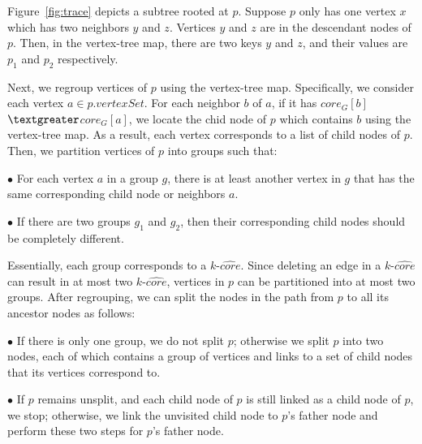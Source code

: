 \begin{example}
\label{em:reorganize}
Figure~\ref{fig:trace} depicts a subtree rooted at $p$.
Suppose $p$ only has one vertex $x$ which has two neighbors $y$ and $z$.
Vertices $y$ and $z$ are in the descendant nodes of $p$.
Then, in the vertex-tree map, there are two keys $y$ and $z$,
and their values are $p_1$ and $p_2$ respectively.
\end{example}

Next, we regroup vertices of $p$ using the vertex-tree map.
Specifically, we consider each vertex $a$$\in p.vertexSet$.
For each neighbor $b$ of $a$, if it has $core_G[b]$$\textgreater$$core_G[a]$,
we locate the chid node of $p$ which contains $b$ using the vertex-tree map.
As a result, each vertex corresponds to a list of child nodes of $p$.
Then, we partition vertices of $p$ into groups such that:

\noindent $\bullet$ For each vertex $a$ in a group $g$,
there is at least another vertex in $g$ that has the same corresponding child node or neighbors $a$.

\noindent $\bullet$ If there are two groups $g_1$ and $g_2$, then their corresponding
child nodes should be completely different.


Essentially, each group corresponds to a $k$-$\widehat{core}$.
Since deleting an edge in a $k$-$\widehat{core}$ can result in at most two $k$-$\widehat{core}$,
vertices in $p$ can be partitioned into at most two groups.
After regrouping, we can split the nodes in the path from $p$ to all its ancestor nodes as follows:

\noindent $\bullet$ If there is only one group, we do not split $p$; otherwise we split $p$ into two nodes, each of which contains a group of vertices and links to a set of child nodes that its vertices correspond to.

\noindent $\bullet$ If $p$ remains unsplit, and each child node of $p$ is still linked as a child node of $p$, we stop; otherwise, we link the unvisited child node to $p$'s father node and perform these two steps for $p$'s father node.

